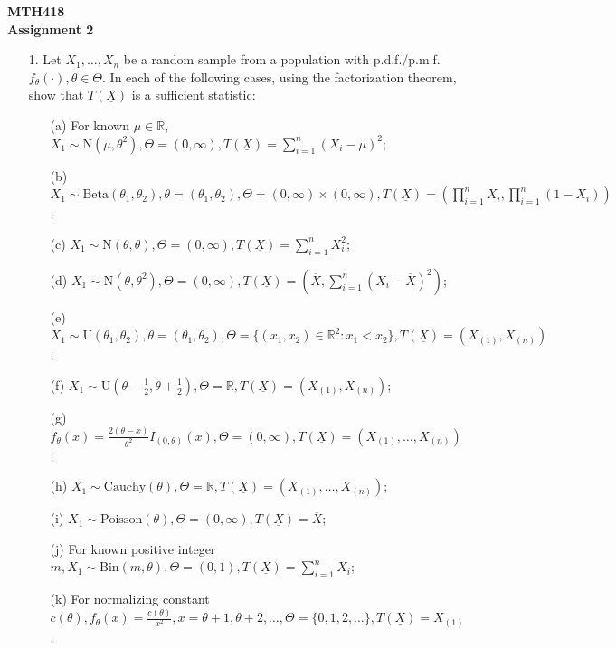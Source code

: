 \documentclass[11pt]{article}
\begin{document}
\begin{center}
    \textbf{MTH418} \\
    \textbf{Assignment 2}
\end{center}

\begin{enumerate}
    \item[1.] Let $X_1, \dots, X_n$ be a random sample from a population with p.d.f./p.m.f. $f_{\theta}(\cdot), \theta \in \Theta$. In each of the following cases, using the factorization theorem, show that $T(\underline{X})$ is a sufficient statistic:
    \begin{enumerate}
        \item[(a)] For known $\mu \in \mathbb{R}$, $X_1 \sim \text{N}(\mu, \theta^2), \Theta = (0, \infty), T(\underline{X}) = \sum_{i=1}^n (X_i - \mu)^2$;
        \item[(b)] $X_1 \sim \text{Beta}(\theta_1, \theta_2), \theta = (\theta_1, \theta_2), \Theta = (0, \infty) \times (0, \infty), T(\underline{X}) = \left(\prod_{i=1}^n X_i, \prod_{i=1}^n (1 - X_i)\right)$;
        \item[(c)] $X_1 \sim \text{N}(\theta, \theta), \Theta = (0, \infty), T(\underline{X}) = \sum_{i=1}^n X_i^2$;
        \item[(d)] $X_1 \sim \text{N}(\theta, \theta^2), \Theta = (0, \infty), T(\underline{X}) = \left(\overline{X}, \sum_{i=1}^n (X_i - \overline{X})^2\right)$;
        \item[(e)] $X_1 \sim \text{U}(\theta_1, \theta_2), \theta = (\theta_1, \theta_2), \Theta = \{(x_1, x_2) \in \mathbb{R}^2 : x_1 < x_2\}, T(\underline{X}) = (X_{(1)}, X_{(n)})$;
        \item[(f)] $X_1 \sim \text{U}(\theta - \frac{1}{2}, \theta + \frac{1}{2}), \Theta = \mathbb{R}, T(\underline{X}) = (X_{(1)}, X_{(n)})$;
        \item[(g)] $f_{\theta}(x) = \frac{2(\theta - x)}{\theta^2} I_{(0, \theta)}(x), \Theta = (0, \infty), T(\underline{X}) = (X_{(1)}, \dots, X_{(n)})$;
        \item[(h)] $X_1 \sim \text{Cauchy}(\theta), \Theta = \mathbb{R}, T(\underline{X}) = (X_{(1)}, \dots, X_{(n)})$;
        \item[(i)] $X_1 \sim \text{Poisson}(\theta), \Theta = (0, \infty), T(\underline{X}) = \overline{X}$;
        \item[(j)] For known positive integer $m, X_1 \sim \text{Bin}(m, \theta), \Theta = (0, 1), T(\underline{X}) = \sum_{i=1}^n X_i$;
        \item[(k)] For normalizing constant $c(\theta), f_{\theta}(x) = \frac{c(\theta)}{x^2}, x = \theta+1, \theta+2, \dots, \Theta = \{0, 1, 2, \dots\}, T(\underline{X}) = X_{(1)}$.
    \end{enumerate}

\end{enumerate}
\end{document}
